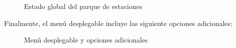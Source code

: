 \begin{figure} [!htb]
	\centering
	\caption{Estado global del parque de estaciones}
	\label{fig:graficoEstadoGlobal}
\end{figure}

\FloatBarrier
Finalmente, el menú desplegable incluye las siguiente opciones adicionales:

\begin{figure} [!htb]
	\centering
	\caption{Menú desplegable y opciones adicionales}
	\label{fig:menuDesplegable}
\end{figure}

